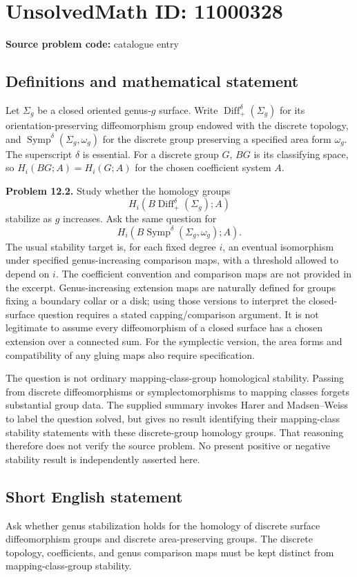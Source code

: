 \documentclass[11pt]{article}
\begin{document}
\section*{UnsolvedMath ID: 11000328}
\textbf{Source problem code:} catalogue entry
\subsection{Definitions and mathematical statement}
Let $\Sigma_g$ be a closed oriented genus-$g$ surface. Write $\operatorname{Diff}_+^\delta(\Sigma_g)$ for its orientation-preserving diffeomorphism group endowed with the discrete topology, and $\operatorname{Symp}^\delta(\Sigma_g,\omega_g)$ for the discrete group preserving a specified area form $\omega_g$. The superscript $\delta$ is essential. For a discrete group $G$, $BG$ is its classifying space, so $H_i(BG;A)=H_i(G;A)$ for the chosen coefficient system $A$.

\textbf{Problem 12.2.} Study whether the homology groups
\[
 H_i(B\operatorname{Diff}_+^\delta(\Sigma_g);A)
\]
stabilize as $g$ increases. Ask the same question for
\[
 H_i(B\operatorname{Symp}^\delta(\Sigma_g,\omega_g);A).
\]
The usual stability target is, for each fixed degree $i$, an eventual isomorphism under specified genus-increasing comparison maps, with a threshold allowed to depend on $i$. The coefficient convention and comparison maps are not provided in the excerpt. Genus-increasing extension maps are naturally defined for groups fixing a boundary collar or a disk; using those versions to interpret the closed-surface question requires a stated capping/comparison argument. It is not legitimate to assume every diffeomorphism of a closed surface has a chosen extension over a connected sum. For the symplectic version, the area forms and compatibility of any gluing maps also require specification.

The question is not ordinary mapping-class-group homological stability. Passing from discrete diffeomorphisms or symplectomorphisms to mapping classes forgets substantial group data. The supplied summary invokes Harer and Madsen--Weiss to label the question solved, but gives no result identifying their mapping-class stability statements with these discrete-group homology groups. That reasoning therefore does not verify the source problem. No present positive or negative stability result is independently asserted here.
\subsection{Short English statement}
Ask whether genus stabilization holds for the homology of discrete surface diffeomorphism groups and discrete area-preserving groups. The discrete topology, coefficients, and genus comparison maps must be kept distinct from mapping-class-group stability.
\end{document}
